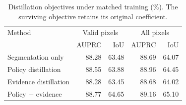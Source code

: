 \begin{table}[!t]
\caption{Distillation objectives under matched training (\%). The surviving objective retains its original coefficient.}
\label{tab:loss_parts}
\centering\scriptsize
\setlength{\tabcolsep}{2.5pt}
\begin{tabular}{lrrrr}
\toprule
Method & \multicolumn{2}{c}{Valid pixels} & \multicolumn{2}{c}{All pixels}\\
 & AUPRC & IoU & AUPRC & IoU\\
\midrule
Segmentation only & 88.28 & 63.48 & 88.69 & 64.07\\
Policy distillation & 88.55 & 63.88 & 88.96 & 64.45\\
Evidence distillation & 88.28 & 63.45 & 88.68 & 64.02\\
Policy + evidence & 88.77 & 64.65 & 89.16 & 65.10\\
\bottomrule
\end{tabular}
\end{table}
